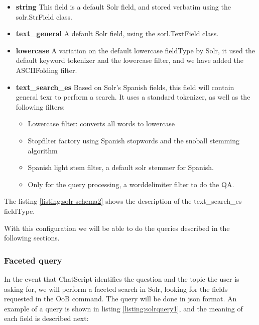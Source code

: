 \begin{itemize}
 \item \textbf{ string } This field is a default Solr field, and stored verbatim using the solr.StrField class.
 \item \textbf{ text\_general } A default Solr field, using the sorl.TextField class.
 \item \textbf{ lowercase } A variation on the default lowercase fieldType by Solr, it used the default keyword tokenizer and the lowercase filter, and we have added the ASCIIFolding filter.
 \item \textbf{ text\_search\_es } Based on Solr's Spanish fields, this field will contain general texr to perform a search. It uses a standard tokenizer, as well as the following filters:
 \begin{itemize}
  \item Lowercase filter: converts all words to lowercase 
  \item Stopfilter factory using Spanish stopwords and the snoball stemming algorithm
  \item Spanish light stem filter, a default solr stemmer for Spanish.
  \item Only for the query processing, a worddelimiter filter to do the QA.
 \end{itemize}
\end{itemize}

The listing \ref{listing:solr-schema2} shows the description of the text\_search\_es fieldType.

\begin{center}
  
\end{center}

With this configuration we will be able to do the queries described in the following sections.


\subsubsection{Faceted query}

In the event that ChatScript identifies the question and the topic the user is asking for, we will perform a faceted search in Solr, looking for the fields requested in the \ac{OoB} command. The query will be done in json format. An example of a query is shown in listing \ref{listing:solrquery1}, and the meaning of each field is described next:

